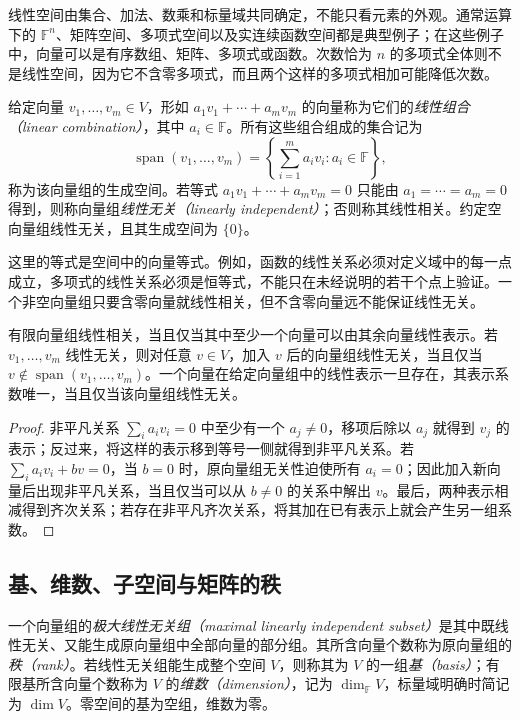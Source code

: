 线性空间由集合、加法、数乘和标量域共同确定，不能只看元素的外观。通常运算下的 $\mathbb F^n$、矩阵空间、多项式空间以及实连续函数空间都是典型例子；在这些例子中，向量可以是有序数组、矩阵、多项式或函数。次数恰为 $n$ 的多项式全体则不是线性空间，因为它不含零多项式，而且两个这样的多项式相加可能降低次数。

\begin{definition}
\label{def:laex-span-independence}
给定向量 $v_1,\ldots,v_m\in V$，形如 $a_1v_1+\cdots+a_mv_m$ 的向量称为它们的\emph{线性组合（linear combination）}，其中 $a_i\in\mathbb F$。所有这些组合组成的集合记为
\[
\operatorname{span}(v_1,\ldots,v_m)
=\left\{\sum_{i=1}^m a_iv_i:a_i\in\mathbb F\right\},
\]
称为该向量组的生成空间。若等式 $a_1v_1+\cdots+a_mv_m=0$ 只能由 $a_1=\cdots=a_m=0$ 得到，则称向量组\emph{线性无关（linearly independent）}；否则称其线性相关。约定空向量组线性无关，且其生成空间为 $\{0\}$。
\end{definition}

这里的等式是空间中的向量等式。例如，函数的线性关系必须对定义域中的每一点成立，多项式的线性关系必须是恒等式，不能只在未经说明的若干个点上验证。一个非空向量组只要含零向量就线性相关，但不含零向量远不能保证线性无关。

\begin{proposition}
\label{prop:laex-dependence-basic}
有限向量组线性相关，当且仅当其中至少一个向量可以由其余向量线性表示。若 $v_1,\ldots,v_m$ 线性无关，则对任意 $v\in V$，加入 $v$ 后的向量组线性无关，当且仅当 $v\notin\operatorname{span}(v_1,\ldots,v_m)$。一个向量在给定向量组中的线性表示一旦存在，其表示系数唯一，当且仅当该向量组线性无关。
\end{proposition}

\begin{proof}
非平凡关系 $\sum_i a_iv_i=0$ 中至少有一个 $a_j\ne0$，移项后除以 $a_j$ 就得到 $v_j$ 的表示；反过来，将这样的表示移到等号一侧就得到非平凡关系。若 $\sum_i a_iv_i+bv=0$，当 $b=0$ 时，原向量组无关性迫使所有 $a_i=0$；因此加入新向量后出现非平凡关系，当且仅当可以从 $b\ne0$ 的关系中解出 $v$。最后，两种表示相减得到齐次关系；若存在非平凡齐次关系，将其加在已有表示上就会产生另一组系数。
\end{proof}

\subsection{基、维数、子空间与矩阵的秩}

\begin{definition}
\label{def:laex-basis-rank}
一个向量组的\emph{极大线性无关组（maximal linearly independent subset）}是其中既线性无关、又能生成原向量组中全部向量的部分组。其所含向量个数称为原向量组的\emph{秩（rank）}。若线性无关组能生成整个空间 $V$，则称其为 $V$ 的一组\emph{基（basis）}；有限基所含向量个数称为 $V$ 的\emph{维数（dimension）}，记为 $\dim_{\mathbb F}V$，标量域明确时简记为 $\dim V$。零空间的基为空组，维数为零。
\end{definition}

